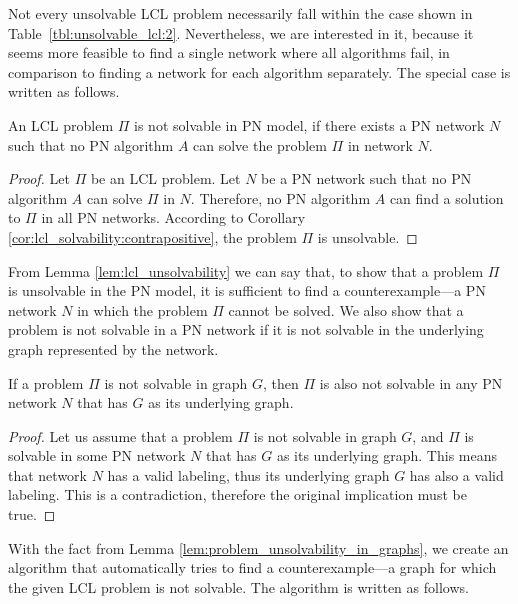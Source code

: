 Not every unsolvable LCL problem necessarily fall within the case shown in Table~\ref{tbl:unsolvable_lcl:2}.
Nevertheless, we are interested in it, because it seems more feasible to find a single network where all algorithms fail, in comparison to finding a network for each algorithm separately.
The special case is written as follows.

\begin{lemma} \label{lem:lcl_unsolvability}
    An LCL problem $\Pi$ is not solvable in PN model, if there exists a PN network $N$ such that no PN algorithm $A$ can solve the problem $\Pi$ in network $N$.
\end{lemma}
\begin{proof}
    Let $\Pi$ be an LCL problem.
    Let $N$ be a PN network such that no PN algorithm $A$ can solve $\Pi$ in $N$.
    Therefore, no PN algorithm $A$ can find a solution to $\Pi$ in all PN networks.
    According to Corollary \ref{cor:lcl_solvability:contrapositive}, the problem $\Pi$ is unsolvable.
\end{proof}

From Lemma \ref{lem:lcl_unsolvability} we can say that, to show that a problem $\Pi$ is unsolvable in the PN model, it is sufficient to find a counterexample---a PN network $N$ in which the problem $\Pi$ cannot be solved.
We also show that a problem is not solvable in a PN network if it is not solvable in the underlying graph represented by the network.

\begin{lemma} \label{lem:problem_unsolvability_in_graphs}
    If a problem $\Pi$ is not solvable in graph $G$, then $\Pi$ is also not solvable in any PN network $N$ that has $G$ as its underlying graph.
\end{lemma}
\begin{proof}
    Let us assume that a problem $\Pi$ is not solvable in graph $G$, and $\Pi$ is solvable in some PN network $N$ that has $G$ as its underlying graph.
    This means that network $N$ has a valid labeling, thus its underlying graph $G$ has also a valid labeling.
    This is a contradiction, therefore the original implication must be true.
\end{proof}

With the fact from Lemma \ref{lem:problem_unsolvability_in_graphs}, we create an algorithm that automatically tries to find a counterexample---a graph for which the given LCL problem is not solvable.
The algorithm is written as follows.

